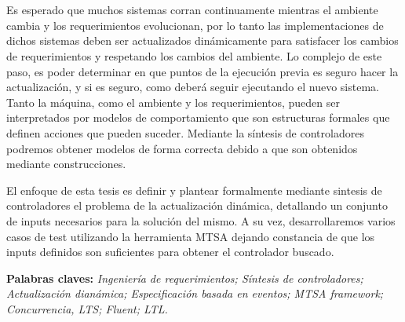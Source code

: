 \chapter*{\runtitulo}

\noindent Es esperado que muchos sistemas corran continuamente mientras el ambiente cambia y los
requerimientos evolucionan, por lo tanto las implementaciones de dichos sistemas deben ser
actualizados dinámicamente para satisfacer los cambios de requerimientos y respetando los cambios
del ambiente. Lo complejo de este paso, es poder determinar en que puntos de la ejecución previa
es seguro hacer la actualización, y si es seguro, como deberá seguir ejecutando el nuevo sistema.
Tanto la máquina, como el ambiente y los requerimientos, pueden ser interpretados por modelos de 
comportamiento que son estructuras formales que definen acciones que pueden suceder. Mediante la
síntesis de controladores podremos obtener modelos de forma correcta debido a que son obtenidos 
mediante construcciones. 

\noindent El enfoque de esta tesis es definir y plantear formalmente mediante sintesis de
controladores el problema de la actualización dinámica, detallando un conjunto de inputs 
necesarios para la solución del mismo. A su vez, desarrollaremos varios casos de test utilizando la
herramienta MTSA dejando constancia de que los inputs definidos son suficientes para obtener el
controlador buscado.

 
\bigskip

\noindent\textbf{Palabras claves:} \textit{Ingeniería de requerimientos; Síntesis de controladores;
Actualización dianámica; Especificación basada en eventos; MTSA framework; Concurrencia, LTS;
Fluent; LTL.}
